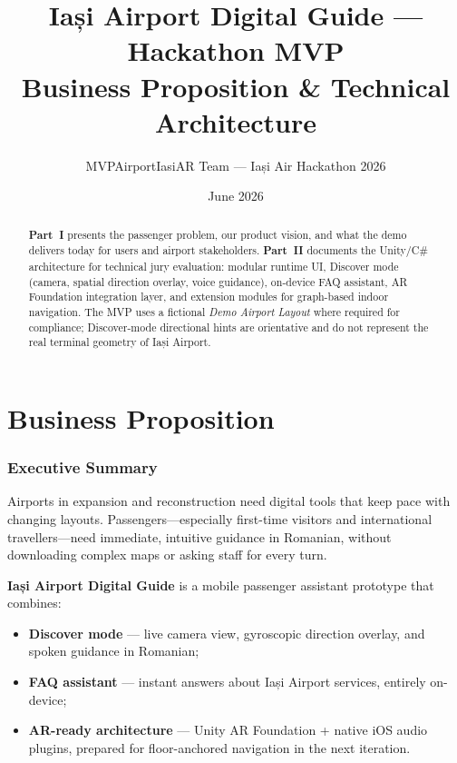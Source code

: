 \documentclass[11pt,a4paper]{article}
\title{%
    \textbf{Iași Airport Digital Guide --- Hackathon MVP}\\[0.4em]
    \large Business Proposition \& Technical Architecture
}
\author{MVPAirportIasiAR Team --- Iași Air Hackathon 2026}
\date{June 2026}
\begin{document}
\maketitle

\begin{abstract}
\textbf{Part~I} presents the passenger problem, our product vision, and what the demo delivers today for users and airport stakeholders. \textbf{Part~II} documents the Unity/C\# architecture for technical jury evaluation: modular runtime UI, Discover mode (camera, spatial direction overlay, voice guidance), on-device FAQ assistant, AR Foundation integration layer, and extension modules for graph-based indoor navigation. The MVP uses a fictional \emph{Demo Airport Layout} where required for compliance; Discover-mode directional hints are orientative and do not represent the real terminal geometry of Iași Airport.
\end{abstract}

\tableofcontents
\newpage

\part{Business Proposition}
\label{part:business}

\section{Executive Summary}

Airports in expansion and reconstruction need digital tools that keep pace with changing layouts. Passengers---especially first-time visitors and international travellers---need immediate, intuitive guidance in Romanian, without downloading complex maps or asking staff for every turn.

\textbf{Iași Airport Digital Guide} is a mobile passenger assistant prototype that combines:

\begin{itemize}[noitemsep]
    \item \textbf{Discover mode} --- live camera view, gyroscopic direction overlay, and spoken guidance in Romanian;
    \item \textbf{FAQ assistant} --- instant answers about Iași Airport services, entirely on-device;
    \item \textbf{AR-ready architecture} --- Unity AR Foundation + native iOS audio plugins, prepared for floor-anchored navigation in the next iteration.
\end{itemize}
\end{document}
